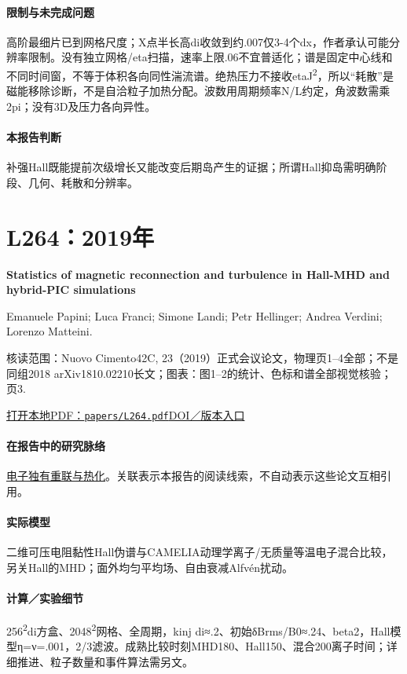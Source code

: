 \paragraph{限制与未完成问题}高阶最细片已到网格尺度；X点半长高di收敛到约.007仅3-4个dx，作者承认可能分辨率限制。没有独立网格/eta扫描，速率上限.06不宜普适化；谱是固定中心线和不同时间窗，不等于体积各向同性湍流谱。绝热压力不接收etaJ\textsuperscript{2}，所以“耗散”是磁能移除诊断，不是自洽粒子加热分配。波数用周期频率N/L约定，角波数需乘2pi；没有3D及压力各向异性。

\paragraph{本报告判断}补强Hall既能提前次级增长又能改变后期岛产生的证据；所谓Hall抑岛需明确阶段、几何、耗散和分辨率。

\section{L264：2019年}\label{paper:L264}

\textbf{Statistics of magnetic reconnection and turbulence in Hall-MHD and hybrid-PIC simulations}\citep{L264}\

Emanuele Papini;  Luca Franci;  Simone Landi;  Petr Hellinger;  Andrea Verdini;  Lorenzo Matteini.

\textsf{核读范围：}Nuovo Cimento42C, 23（2019）正式会议论文，物理页1–4全部；不是同组2018 arXiv1810.02210长文；\textsf{图表：}图1–2的统计、色标和谱全部视觉核验；页3.

\href{run:papers/L264.pdf}{打开本地PDF：\texttt{papers/L264.pdf}}\quad\href{https://doi.org/10.1393/ncc/i2019-19023-0}{DOI／版本入口}

\paragraph{在报告中的研究脉络}\hyperref[story:energy]{电子独有重联与热化}。关联表示本报告的阅读线索，不自动表示这些论文互相引用。

\paragraph{实际模型}二维可压电阻黏性Hall伪谱与CAMELIA动理学离子/无质量等温电子混合比较，另关Hall的MHD；面外均匀平均场、自由衰减Alfvén扰动。

\paragraph{计算／实验细节}256\textsuperscript{2}di方盒、2048\textsuperscript{2}网格、全周期，kinj di≈.2、初始δBrms/B0≈.24、beta2，Hall模型η=ν=.001，2/3滤波。成熟比较时刻MHD180、Hall150、混合200离子时间；详细推进、粒子数量和事件算法需另文。


